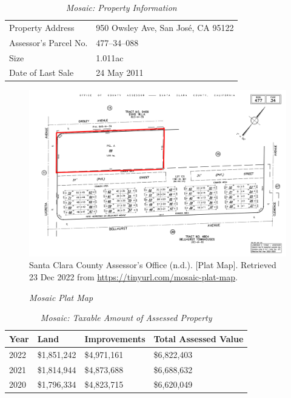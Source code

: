 \begin{table}[htbp]
  \SingleSpacing%
  \caption[Mosaic: Property Information]{\textit{Mosaic: Property Information}}\label{tab:mosaic-prop-info}
  \begin{tabular}{ll}
    \toprule
    Property Address      & 950 Owsley Ave, San José, CA 95122 \\
    Assessor's Parcel No. & 477–34–088 \\
    Size                  & 1.011ac \\
    Date of Last Sale     & 24 May 2011 \\
    \bottomrule
  \end{tabular}
\end{table}

\begin{figure}[hbtp]
    \caption[Mosaic Plat Map]{\textit{Mosaic Plat Map}}\label{fig:mosaic-plat-map}
    \includegraphics[width=\textwidth]{Assessor-Info/mosaic-plat-map-477-34}\\ %
    \footnotesize{Santa Clara County Assessor's Office (n.d.). [Plat Map]. Retrieved 23 Dec 2022 from  \url{https://tinyurl.com/mosaic-plat-map}}.
\end{figure}

\begin{table}[hbtp]
  \SingleSpacing%
  \caption[Mosaic: Taxable Amount of Assessed Propery]{\textit{Mosaic: Taxable Amount of Assessed Property}}\label{tab:mosaic-taxable-amount}
  \begin{tabular}{llll}
    \toprule
    Year & Land        & Improvements & Total Assessed Value \\
    \midrule
    2022 & \$1,851,242 & \$4,971,161 & \$6,822,403 \\
    2021 & \$1,814,944 & \$4,873,688 & \$6,688,632 \\
    2020 & \$1,796,334 & \$4,823,715 & \$6,620,049 \\
    \bottomrule
  \end{tabular}
\end{table}

